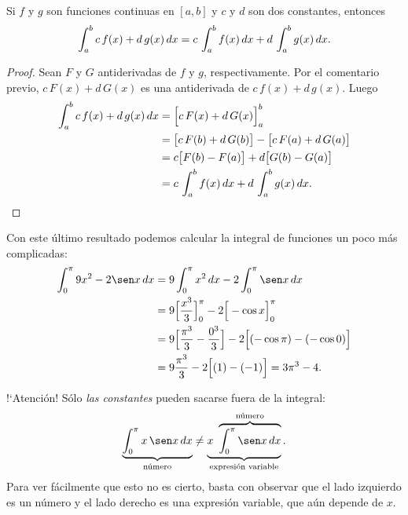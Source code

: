 \begin{corollary}
Si $f$ y $g$ son funciones continuas en $[a,b]$ y $c$ y $d$ son dos constantes, entonces
$$ 
\int_a^b   c\, f(x)+d\, g(x) \,dx 
=
c\, \int_a^b  f(x) \,dx 
+
d\, \int_a^b   g(x) \,dx .
$$
\end{corollary}

\begin{proof}
  Sean $F$ y $G$ antiderivadas de $f$ y $g$, respectivamente.
  Por el comentario previo, $c\, F(x) + d\, G(x)$ es una antiderivada de $c\, f(x)+d\, g(x)$.
  Luego
  \begin{align*}
    \int_a^b   c\, f(x)+d\, g(x) \,dx  &= \Big[c\, F(x) + d\, G(x)\Big]_a^b
    \\
    &= \big[c\, F(b) + d\, G(b)\big] - \big[c\, F(a) + d\, G(a)\big]
    \\
    &= c \big[F(b)-F(a)\big] + d \big[G(b)-G(a)\big] 
    \\
    &= c\, \int_a^b  f(x) \,dx 
    +
    d\, \int_a^b   g(x) \,dx .
    \qedhere
  \end{align*}
\end{proof}

\begin{example}
  Con este último resultado podemos calcular la integral de funciones un poco más complicadas:
  \begin{align*}
    \int_0^\pi 9x^2 - 2 \sen x\dx
    &= 9 \int_0^\pi x^2 \dx - 2 \int_0^\pi \sen x\dx
    \\
    &= 9 \Big[ \frac{x^3}3\Big]_0^\pi  - 2 \Big[-\cos x\Big]_0^\pi
    \\
    &= 9 \Big[ \frac{\pi^3}3-\frac{0^3}3\Big]  - 2 \Big[(-\cos \pi)-(-\cos 0)\Big]
    \\
    &= 9 \frac{\pi^3}3 - 2 \Big[(1)-(-1)\Big]
    = 3 \pi^3 - 4.
  \end{align*}
\end{example}

\begin{remark}
  !`Atención! Sólo \emph{las constantes} pueden sacarse fuera de la integral:
  \[
  \underbrace{\int_0^\pi x\, \sen x\dx}_{\text{número}} \neq \underbrace{x \  \overbrace{\int_0^\pi \sen x\dx}^{\text{número}}}_{\text{expresión variable}}.
  \]
  Para ver fácilmente que esto no es cierto, basta con observar que el lado izquierdo es un número y el lado derecho es una expresión variable, que aún depende de $x$.
\end{remark}



